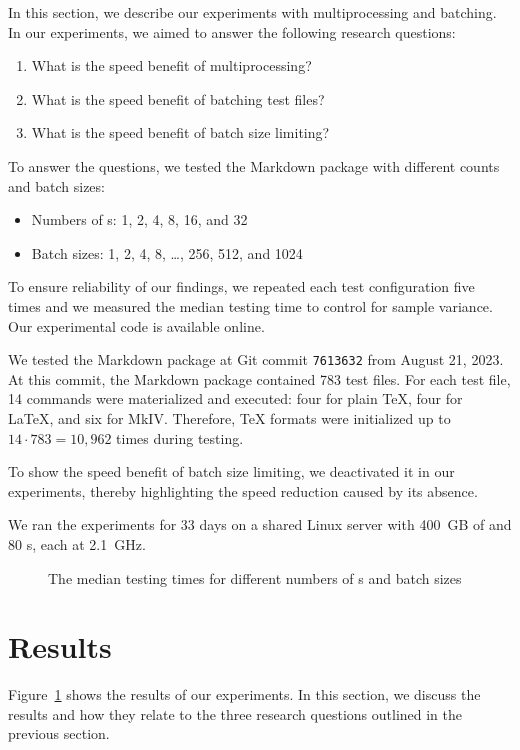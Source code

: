 \documentclass[final]{ltugboat}
\begin{document}
In this section, we describe our experiments with multiprocessing and batching. In our experiments, we aimed to answer the following research questions:
\begin{enumerate}
\item What is the speed benefit of multiprocessing?
\item What is the speed benefit of batching test files?
\item What is the speed benefit of batch size limiting?
\end{enumerate}
To answer the questions, we tested the Markdown package with different  counts and batch sizes:
\begin{itemize}
\item Numbers of s: 1, 2, 4, 8, 16, and 32
\item Batch sizes: 1, 2, 4, 8, \ldots, 256, 512, and 1024
\end{itemize}
To ensure reliability of our findings, we repeated each test configuration five times and we measured the median testing time to control for sample variance. Our experimental code is available online.~\cite{starynovotny2023measure}

We tested the Markdown package at Git commit \texttt{7613632} from August 21, 2023. At this commit, the Markdown package contained 783 test files. For each test file, 14 commands were materialized and executed: four for plain \TeX, four for \LaTeX, and six for  MkIV. Therefore, \TeX{} formats were initialized up to $14\cdot 783 = 10{,}962$ times during testing.

To show the speed benefit of batch size limiting, we deactivated it in our experiments, thereby highlighting the speed reduction caused by its absence.

We ran the experiments for 33 days on a shared Linux server with 400~GB of  and 80 s, each at 2.1~GHz.

\begin{figure}[b!]

\caption{The median testing times for different numbers of s and batch sizes}
\label{fig:results}
\end{figure}

\section{Results}
\label{sec:results}

Figure~\ref{fig:results} shows the results of our experiments. In this section, we discuss the results and how they relate to the three research questions outlined in the previous section.
\end{document}
